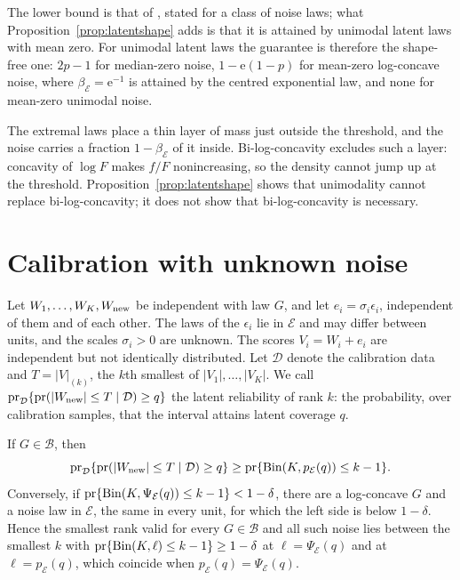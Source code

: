 \documentclass[lineno]{biometrika}
\newcommand{\pr}{\mathrm{pr}}
\begin{document}
The lower bound is that of \citet[Proposition~2.3]{guille2024}, stated for a class of noise laws; what Proposition~\ref{prop:latentshape} adds is that it is attained by unimodal latent laws with mean zero. For unimodal latent laws the guarantee is therefore the shape-free one: $2p - 1$ for median-zero noise, $1 - \mathrm{e}(1 - p)$ for mean-zero log-concave noise, where $\beta_{\mathcal E} = \mathrm{e}^{-1}$ is attained by the centred exponential law, and none for mean-zero unimodal noise.

The extremal laws place a thin layer of mass just outside the threshold, and the noise carries a fraction $1 - \beta_{\mathcal E}$ of it inside. Bi-log-concavity excludes such a layer: concavity of $\log F$ makes $f/F$ nonincreasing, so the density cannot jump up at the threshold. Proposition~\ref{prop:latentshape} shows that unimodality cannot replace bi-log-concavity; it does not show that bi-log-concavity is necessary.


\section{Calibration with unknown noise}\label{sec:procedure}

Let $W_1, \ldots, W_K, W_{\rm new}$ be independent with law $G$, and let $e_i = \sigma_i\epsilon_i$, independent of them and of each other. The laws of the $\epsilon_i$ lie in $\mathcal E$ and may differ between units, and the scales $\sigma_i > 0$ are unknown. The scores $V_i = W_i + e_i$ are independent but not identically distributed. Let $\mathcal D$ denote the calibration data and $T = |V|_{(k)}$, the $k$th smallest of $|V_1|, \ldots, |V_K|$. We call $\pr_{\mathcal D}\{\pr(|W_{\rm new}| \le T \mid \mathcal D) \ge q\}$ the latent reliability of rank $k$: the probability, over calibration samples, that the interval attains latent coverage $q$.

\begin{theorem}\label{prop:unknown}
If $G \in \mathcal B$, then
\[
\pr_{\mathcal D}\{\pr(|W_{\rm new}| \le T \mid \mathcal D) \ge q\} \ge \pr\{{\rm Bin}(K, p_{\mathcal E}(q)) \le k - 1\}.
\]
Conversely, if $\pr\{{\rm Bin}(K, \Psi_{\mathcal E}(q)) \le k - 1\} < 1 - \delta$, there are a log-concave $G$ and a noise law in $\mathcal E$, the same in every unit, for which the left side is below $1 - \delta$. Hence the smallest rank valid for every $G \in \mathcal B$ and all such noise lies between the smallest $k$ with $\pr\{{\rm Bin}(K, \ell) \le k - 1\} \ge 1 - \delta$ at $\ell = \Psi_{\mathcal E}(q)$ and at $\ell = p_{\mathcal E}(q)$, which coincide when $p_{\mathcal E}(q) = \Psi_{\mathcal E}(q)$.
\end{theorem}
\end{document}
